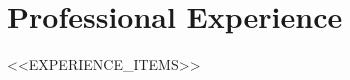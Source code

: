 \section*{Professional Experience}
\resumeSubHeadingListStart
<<EXPERIENCE_ITEMS>>
\resumeSubHeadingListEnd
\vspace{-0.2cm}
